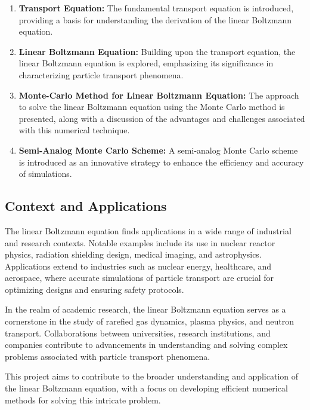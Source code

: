 \documentclass[a4paper, 11pt]{article}
\begin{document}
	\begin{enumerate}
		\item \textbf{Transport Equation:} The fundamental transport equation is introduced, providing a basis for understanding the derivation of the linear Boltzmann equation.
		
		\item \textbf{Linear Boltzmann Equation:} Building upon the transport equation, the linear Boltzmann equation is explored, emphasizing its significance in characterizing particle transport phenomena.
		
		\item \textbf{Monte-Carlo Method for Linear Boltzmann Equation:} The approach to solve the linear Boltzmann equation using the Monte Carlo method is presented, along with a discussion of the advantages and challenges associated with this numerical technique.
		
		\item \textbf{Semi-Analog Monte Carlo Scheme:} A semi-analog Monte Carlo scheme is introduced as an innovative strategy to enhance the efficiency and accuracy of simulations.
	\end{enumerate}
	
\subsection{Context and Applications}
	
	The linear Boltzmann equation finds applications in a wide range of industrial and research contexts. Notable examples include its use in nuclear reactor physics, radiation shielding design, medical imaging, and astrophysics. Applications extend to industries such as nuclear energy, healthcare, and aerospace, where accurate simulations of particle transport are crucial for optimizing designs and ensuring safety protocols.
	
	In the realm of academic research, the linear Boltzmann equation serves as a cornerstone in the study of rarefied gas dynamics, plasma physics, and neutron transport. Collaborations between universities, research institutions, and companies contribute to advancements in understanding and solving complex problems associated with particle transport phenomena.
	
	
	\medbreak
	
	This project aims to contribute to the broader understanding and application of the linear Boltzmann equation, with a focus on developing efficient numerical methods for solving this intricate problem.
\end{document}
